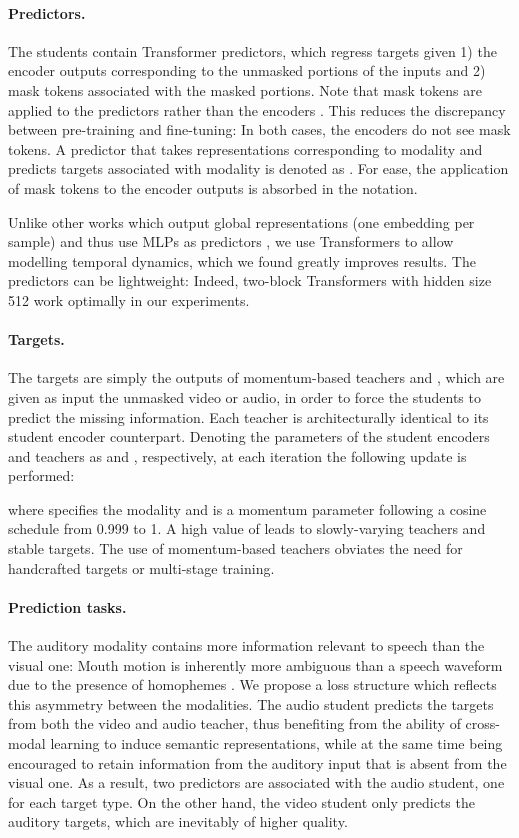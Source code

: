 \documentclass{article} \usepackage{iclr2023_conference,times}
\begin{document}
\paragraph{Predictors.} 
The students contain Transformer predictors, which regress targets given 1) the encoder outputs corresponding to the unmasked portions of the inputs and 2) mask tokens associated with the masked portions. Note that mask tokens are applied to the predictors rather than the encoders \citep{he2021masked}. This reduces the discrepancy between pre-training and fine-tuning: In both cases, the encoders do not see mask tokens. A predictor that takes representations corresponding to modality  and predicts targets associated with modality  is denoted as . For ease, the application of mask tokens to the encoder outputs is absorbed in the notation. 

Unlike other works which output global representations (one embedding per sample) and thus use MLPs as predictors \citep{grill2020bootstrap, chen2021empirical}, we use Transformers to allow modelling temporal dynamics, which we found greatly improves results. The predictors can be lightweight: Indeed, two-block Transformers with hidden size 512 work optimally in our experiments.

\paragraph{Targets.} The targets are simply the outputs of momentum-based teachers  and  \citep{grill2020bootstrap, caron2021emerging}, which are given as input the unmasked video or audio, in order to force the students to predict the missing information. Each teacher is architecturally identical to its student encoder counterpart. Denoting the parameters of the student encoders and teachers as  and , respectively, at each iteration the following update is performed:

where  specifies the modality and  is a momentum parameter following a cosine schedule from 0.999 to 1. A high value of  leads to slowly-varying teachers and stable targets. The use of momentum-based teachers obviates the need for handcrafted targets or multi-stage training.

\paragraph{Prediction tasks.} The auditory modality contains more information relevant to speech than the visual one: Mouth motion is inherently more ambiguous than a speech waveform due to the presence of homophemes \citep{chung2017lip}. We propose a loss structure which reflects this asymmetry between the modalities. The audio student predicts the targets from both the video and audio teacher, thus benefiting from the ability of cross-modal learning to induce semantic representations, while at the same time being encouraged to retain information from the auditory input that is absent from the visual one. As a result, two predictors are associated with the audio student, one for each target type. On the other hand, the video student only predicts the auditory targets, which are inevitably of higher quality. 
\end{document}

